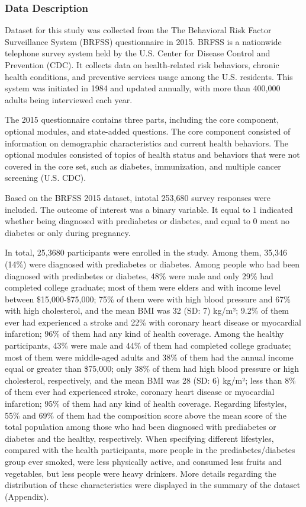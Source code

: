 \documentclass[
  12pt,
]{article}
\begin{document}
\hypertarget{data-description}{%
\subsubsection{Data Description}\label{data-description}}

Dataset for this study was collected from the The Behavioral Risk Factor
Surveillance System (BRFSS) questionnaire in 2015. BRFSS is a nationwide
telephone survey system held by the U.S. Center for Disease Control and
Prevention (CDC). It collects data on health-related risk behaviors,
chronic health conditions, and preventive services usage among the U.S.
residents. This system was initiated in 1984 and updated annually, with
more than 400,000 adults being interviewed each year.

The 2015 questionnaire contains three parts, including the core
component, optional modules, and state-added questions. The core
component consisted of information on demographic characteristics and
current health behaviors. The optional modules consisted of topics of
health status and behaviors that were not covered in the core set, such
as diabetes, immunization, and multiple cancer screening (U.S. CDC).

Based on the BRFSS 2015 dataset, intotal 253,680 survey responses were
included. The outcome of interest was a binary variable. It equal to 1
indicated whether being diagnosed with prediabetes or diabetes, and
equal to 0 meat no diabetes or only during pregnancy.

In total, 25,3680 participants were enrolled in the study. Among them,
35,346 (14\%) were diagnosed with prediabetes or diabetes. Among people
who had been diagnosed with prediabetes or diabetes, 48\% were male and
only 29\% had completed college graduate; most of them were elders and
with income level between \$15,000-\$75,000; 75\% of them were with high
blood pressure and 67\% with high cholesterol, and the mean BMI was 32
(SD: 7) kg/m²; 9.2\% of them ever had experienced a stroke and 22\% with
coronary heart disease or myocardial infarction; 96\% of them had any
kind of health coverage. Among the healthy participants, 43\% were male
and 44\% of them had completed college graduate; most of them were
middle-aged adults and 38\% of them had the annual income equal or
greater than \$75,000; only 38\% of them had high blood pressure or high
cholesterol, respectively, and the mean BMI was 28 (SD: 6) kg/m²; less
than 8\% of them ever had experienced stroke, coronary heart disease or
myocardial infarction; 95\% of them had any kind of health coverage.
Regarding lifestyles, 55\% and 69\% of them had the composition score
above the mean score of the total population among those who had been
diagnosed with prediabetes or diabetes and the healthy, respectively.
When specifying different lifestyles, compared with the health
participants, more people in the prediabetes/diabetes group ever smoked,
were less physically active, and consumed less fruits and vegetables,
but less people were heavy drinkers. More details regarding the
distribution of these characteristics were displayed in the summary of
the dataset (Appendix).
\end{document}
